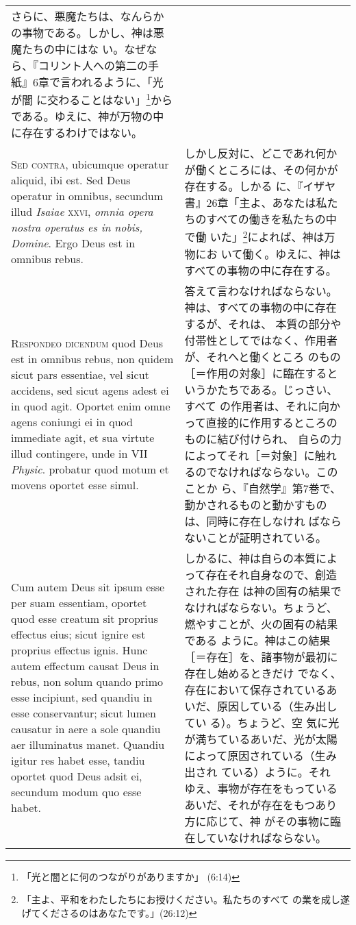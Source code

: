 \documentclass[10pt]{jsarticle} %
\begin{document}
\begin{longtable}{p{21em}p{21em}}
さらに、悪魔たちは、なんらかの事物である。しかし、神は悪魔たちの中にはな
 い。なぜなら、『コリント人への第二の手紙』6章で言われるように、「光が闇
 に交わることはない」\footnote{「光と闇とに何のつながりがありますか」
 (6:14)}からである。ゆえに、神が万物の中に存在するわけではない。

\\


{\scshape Sed contra}, ubicumque operatur aliquid, ibi est. Sed Deus
 operatur in omnibus, secundum illud {\itshape Isaiae} {\scshape xxvi},
 {\itshape omnia opera nostra operatus es in nobis, Domine}. Ergo Deus
 est in omnibus rebus.  &

しかし反対に、どこであれ何かが働くところには、その何かが存在する。しかる
 に、『イザヤ書』26章「主よ、あなたは私たちのすべての働きを私たちの中で働
 いた」\footnote{「主よ、平和をわたしたちにお授けください。私たちのすべて
 の業を成し遂げてくださるのはあなたです。」(26:12)}によれば、神は万物にお
 いて働く。ゆえに、神はすべての事物の中に存在する。

\\


{\scshape Respondeo dicendum} quod Deus est in omnibus rebus, non quidem sicut pars
 essentiae, vel sicut accidens, sed sicut agens adest ei in quod
 agit. Oportet enim omne agens coniungi ei in quod immediate agit, et
 sua virtute illud contingere, unde in VII {\itshape Physic}. probatur quod motum
 et movens oportet esse simul. 

&
答えて言わなければならない。神は、すべての事物の中に存在するが、それは、
 本質の部分や付帯性としてではなく、作用者が、それへと働くところ
 のもの［＝作用の対象］に臨在するというかたちである。じっさい、すべて
 の作用者は、それに向かって直接的に作用するところのものに結び付けられ、
 自らの力によってそれ［＝対象］に触れるのでなければならない。このことか
 ら、『自然学』第7巻で、動かされるものと動かすものは、同時に存在しなけれ
 ばならないことが証明されている。

\\

Cum autem Deus sit ipsum esse per suam essentiam, oportet quod
 esse creatum sit proprius effectus eius; sicut ignire est proprius
 effectus ignis. Hunc autem effectum causat Deus in rebus, non solum
 quando primo esse incipiunt, sed quandiu in esse conservantur; sicut
 lumen causatur in aere a sole quandiu aer illuminatus manet. Quandiu
 igitur res habet esse, tandiu oportet quod Deus adsit ei, secundum
 modum quo esse habet. 

&
しかるに、神は自らの本質によって存在それ自身なので、創造された存在
 は神の固有の結果でなければならない。ちょうど、燃やすことが、火の固有の結果である
 ように。神はこの結果［＝存在］を、諸事物が最初に存在し始めるときだけ
 でなく、存在において保存されているあいだ、原因している（生み出してい
 る）。ちょうど、空
 気に光が満ちているあいだ、光が太陽によって原因されている（生み出され
 ている）ように。それ
 ゆえ、事物が存在をもっているあいだ、それが存在をもつあり方に応じて、神
 がその事物に臨在していなければならない。


\end{longtable}
\end{document}
